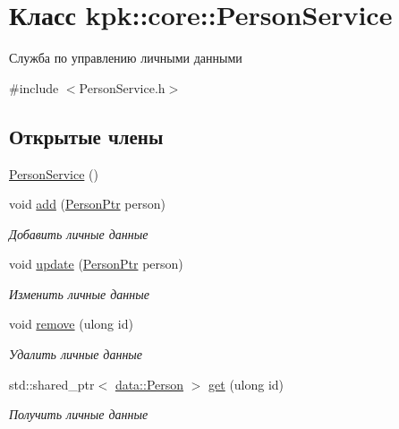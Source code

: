 \hypertarget{classkpk_1_1core_1_1_person_service}{}\section{Класс kpk\+:\+:core\+:\+:Person\+Service}
\label{classkpk_1_1core_1_1_person_service}


Служба по управлению личными данными  




{\ttfamily \#include $<$Person\+Service.\+h$>$}

\subsection*{Открытые члены}
\begin{DoxyCompactItemize}
\item 
\hyperlink{classkpk_1_1core_1_1_person_service_a4c4a362520b4017ad471ea8ac66b94c4}{Person\+Service} ()
\item 
void \hyperlink{classkpk_1_1core_1_1_person_service_ad9944affacfbf9e54bb0292c075f9cd4}{add} (\hyperlink{namespacekpk_1_1core_ab7506e35456bfb9d583bc7815bbb5ca4}{Person\+Ptr} person)
\begin{DoxyCompactList}\small\item\em Добавить личные данные \end{DoxyCompactList}\item 
void \hyperlink{classkpk_1_1core_1_1_person_service_a98a60349c8aeb570be80116e67814c65}{update} (\hyperlink{namespacekpk_1_1core_ab7506e35456bfb9d583bc7815bbb5ca4}{Person\+Ptr} person)
\begin{DoxyCompactList}\small\item\em Изменить личные данные \end{DoxyCompactList}\item 
void \hyperlink{classkpk_1_1core_1_1_person_service_a42c2e03d47b6002dc35190a7b904717d}{remove} (ulong id)
\begin{DoxyCompactList}\small\item\em Удалить личные данные \end{DoxyCompactList}\item 
std\+::shared\+\_\+ptr$<$ \hyperlink{classkpk_1_1data_1_1_person}{data\+::\+Person} $>$ \hyperlink{classkpk_1_1core_1_1_person_service_a3dbe80fc1ca2e472c23f5615f93e56ca}{get} (ulong id)
\begin{DoxyCompactList}\small\item\em Получить личные данные \end{DoxyCompactList}\item 

\end{DoxyCompactItemize}
